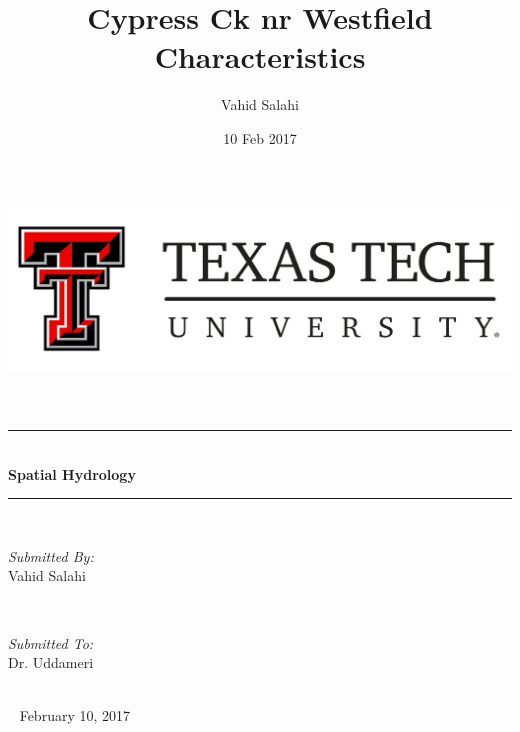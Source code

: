 \documentclass[letterpaper,12pt]{article}
\title{Cypress Ck nr Westfield Characteristics}								%
\author{Vahid Salahi}								%
\date{10 Feb 2017}											%
\begin{document}
	


\begin{titlepage}
	\centering
    \vspace*{0 cm}
    \includegraphics[scale = 0.2]{logottu}\\[3.0 cm]	%
    \\[2.0 cm]
	\textsc{\Large }\\[0.1 cm]				%
	\rule{\linewidth}{0.1 mm} \\[0.4 cm]
	{ \huge \bfseries Spatial Hydrology}\\
	\rule{\linewidth}{0.2 mm} \\[1.5 cm]
	
	\begin{minipage}{0.4\textwidth}
		\begin{flushleft} \large
			\emph{Submitted By:}\\
			Vahid Salahi\\
            
		\end{flushleft}
	\end{minipage}~
	\begin{minipage}{0.4\textwidth}   
		\begin{flushright} \large
			\emph{Submitted To:} \\
			Dr.	Uddameri\\
		\end{flushright}
        
	\end{minipage}\\[2 cm]

~
    { February 10, 2017}\\[1 cm]
    
\end{titlepage}

\end{document}
